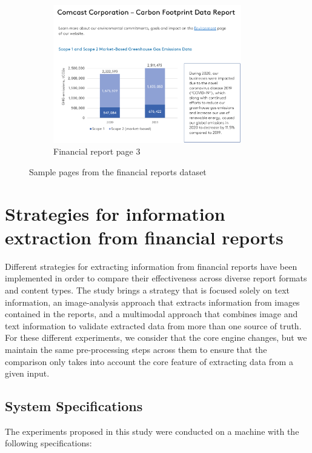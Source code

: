 \documentclass[english, 12pt, a4paper, elec, utf8, a-2b, online]{aaltothesis}
\begin{document}
\begin{figure}[h]
\begin{subfigure}{0.45\textwidth}
        \includegraphics[width=0.9\textwidth]{images/ghg_emissions_bar_chart.png}
        \caption{Financial report page 3}
        \label{fig:financial_report_3}
    \end{subfigure}
    \caption{Sample pages from the financial reports dataset}
    \label{fig:financial_reports}
\end{figure}

\clearpage

\section{Strategies for information extraction from financial reports}

Different strategies for extracting information from financial reports have been implemented in order to compare their effectiveness across diverse report formats and content types.
The study brings a strategy that is focused solely on text information, an image-analysis approach that extracts information from images contained in the reports, and a multimodal approach that combines image and text information to validate extracted data from more than one source of truth.
For these different experiments, we consider that the core engine changes, but we maintain the same pre-processing steps across them to ensure that the comparison only takes into account the core feature of extracting data from a given input.

\subsection{System Specifications}

The experiments proposed in this study were conducted on a machine with the following specifications:
\end{document}
